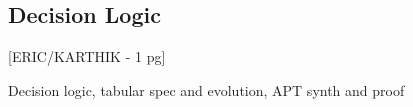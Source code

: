 \subsection{Decision Logic}

[ERIC/KARTHIK - 1 pg]
 
Decision logic, tabular spec and evolution, APT synth and proof
